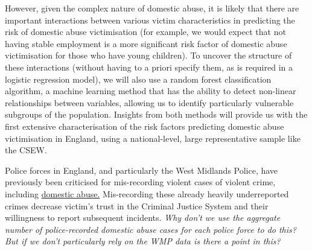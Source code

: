 \documentclass[11pt, a4paper]{article}
\begin{document}
 However, given the complex nature of domestic abuse, it is likely that there are important interactions between various victim characteristics in predicting the risk of domestic abuse victimisation (for example, we would expect that not having stable employment is a more significant risk factor of domestic abuse victimisation for those who have young children). To uncover the structure of these interactions (without having to a priori specify them, as is required in a logistic regression model), we will also use a random forest classification algorithm, a machine learning method that has the ability to detect non-linear relationships between variables, allowing us to identify particularly vulnerable subgroups of the population. Insights from both methods will provide us with the first extensive characterisation of the risk factors predicting domestic abuse victimisation in England, using a national-level, large representative sample like the CSEW.
 
 
 Police forces in England, and particularly the West Midlands Police, have previously been criticised for mis-recording violent cases of violent crime, including \href{https://www.bbc.co.uk/news/uk-england-468676578}{domestic abuse.} Mis-recording these already heavily underreported crimes decrease victim's trust in the Criminal Justice System and their willingness to report subsequent incidents. \textit{Why don't we use the aggregate number of police-recorded domestic abuse cases for each police force to do this? But if we don't particularly rely on the WMP data is there a point in this?}
\end{document}
